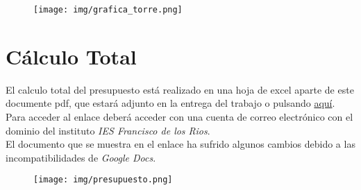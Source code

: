 \documentclass{article}
\begin{document}
        \begin{figure}[h]
          \centering
          \texttt{[image: img/grafica\_torre.png]}
        \end{figure}
  
  \newpage
    \section{Cálculo Total}
    El calculo total del presupuesto está realizado en una hoja de excel aparte de este documente pdf, que estará adjunto en la entrega del trabajo o pulsando 
      \href{https://docs.google.com/spreadsheets/d/1QcJNiRX8_5uzQwFWxm1sg9caJhW-I9_s8lwbnKsULlU/edit?usp=sharing}{aquí}. Para acceder al enlace deberá acceder con una cuenta de correo electrónico con el dominio del 
      instituto \textit{IES Francisco de los Rios}.
      \\
      El documento que se muestra en el enlace ha sufrido algunos cambios debido a las incompatibilidades de \textit{Google Docs}.
      \\
      \begin{figure}[h]
        \centering
        \texttt{[image: img/presupuesto.png]}
      \end{figure}
\end{document}

